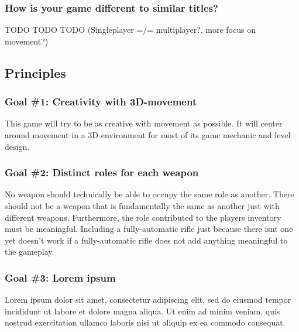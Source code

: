 \documentclass[10pt,a4paper]{article}
\begin{document}
\subsubsection{How is your game different to similar titles?}
TODO TODO TODO
(Singleplayer =/= multiplayer?, more focus on movement?)
\subsection{Principles}
\subsubsection{Goal \#1: Creativity with 3D-movement}
This game will try to be as creative with movement as possible. It will center around movement in a 3D environment for most of its game mechanic and level design.
\subsubsection{Goal \#2: Distinct roles for each weapon}
No weapon should technically be able to occupy the same role as another. There should not be a weapon that is fundamentally the same as another just with different weapons. Furthermore, the role contributed to the players inventory must be meaningful. Including a fully-automatic rifle just because there isnt one yet doesn't work if a fully-automatic rifle does not add anything meaningful to the gameplay. 
\subsubsection{Goal \#3: Lorem ipsum}
Lorem ipsum dolor sit amet, consectetur adipiscing elit, sed do eiusmod tempor incididunt ut labore et dolore magna aliqua. Ut enim ad minim veniam, quis nostrud exercitation ullamco laboris nisi ut aliquip ex ea commodo consequat.
\end{document}
